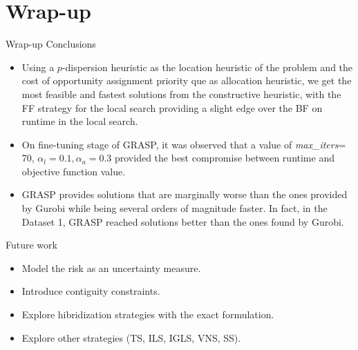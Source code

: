 \documentclass{beamer}
\begin{document}
\section{Wrap-up}

\begin{frame}{Wrap-up}
    \small Conclusions
    \scriptsize
    \begin{itemize}
        \item Using a $p$-dispersion heuristic as the location heuristic of the problem and the cost of opportunity assignment priority que as allocation heuristic, we get the most feasible and fastest solutions from the constructive heuristic, with the FF strategy for the local search providing a slight edge over the BF on runtime in the local search.
        \item On fine-tuning stage of GRASP, it was observed that a value of \textit{max\_iters}= 70, $\alpha_l = 0.1, \alpha_a = 0.3$ provided the best compromise between runtime and objective function value.
        \item GRASP provides solutions that are marginally worse than the ones provided by Gurobi while being several orders of magnitude faster. In fact, in the Dataset 1, GRASP reached solutions better than the ones found by Gurobi.
    \end{itemize}
    \small Future work
    \scriptsize
    \begin{itemize}
        \item Model the risk as an uncertainty measure.
        \item Introduce contiguity constraints.
        \item Explore hibridization strategies with the exact formulation.
        \item Explore other strategies (TS, ILS, IGLS, VNS, SS).
    \end{itemize}
\end{frame}
\end{document}
